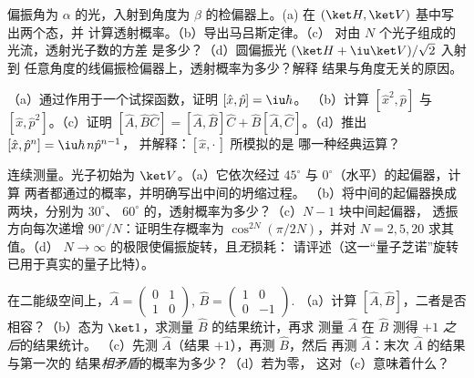 \begin{exercise}[$\star$]\label{exo:b3:quantum-formalism:3}
偏振角为 $\alpha$ 的光，入射到角度为
$\beta$ 的检偏器上。(a) 在 $(\ket H, \ket V)$ 基中写出两个态，并
计算透射概率。（b）导出马吕斯定律。（c）
对由 $N$ 个光子组成的光流，透射光子数的方差
是多少？（d）圆偏振光 $(\ket H + \iu\ket V)/\sqrt2$ 入射到
任意角度的线偏振检偏器上，透射概率为多少？解释
结果与角度无关的原因。
\end{exercise}

\begin{exercise}[$\star$]\label{exo:b3:quantum-formalism:4}
（a）通过作用于一个试探函数，证明 $[\hat x, \hat p] = \iu\hbar$。
（b）计算 $[\hat x^2, \hat p]$ 与 $[\hat x, \hat p^2]$。（c）证明
$[\hat A, \hat B\hat C] = [\hat A, \hat B]\hat C + \hat B[\hat A,
\hat C]$。（d）推出 $[\hat x, \hat p^n] = \iu\hbar\,n\hat p^{n-1}$，
并解释：$[\hat x, \cdot\,]$ 所模拟的是
哪一种经典运算？
\end{exercise}

\begin{exercise}[$\star\star$]\label{exo:b3:quantum-formalism:5}
连续测量。光子初始为 $\ket V$。（a）它依次经过
$45^\circ$ 与 $0^\circ$（水平）的起偏器，计算
两者都通过的概率，并明确写出中间的坍缩过程。
（b）将中间的起偏器换成两块，分别为 $30^\circ$、
$60^\circ$ 的，透射概率为多少？（c）$N - 1$ 块中间起偏器，
透振方向每次递增 $90^\circ/N$：证明生存概率为
$\cos^{2N}(\pi/2N)$，并对 $N = 2, 5, 20$ 求其值。（d）
$N \to \infty$ 的极限使偏振旋转，且\emph{无}损耗：
请评述（这一“量子芝诺”旋转已用于真实的量子比特）。
\end{exercise}

\begin{exercise}[$\star\star$]\label{exo:b3:quantum-formalism:6}
在二能级空间上，$\hat A = \begin{pmatrix}0&1\\1&0
\end{pmatrix}$, $\hat B = \begin{pmatrix}1&0\\0&-1\end{pmatrix}$.
（a）计算 $[\hat A, \hat B]$，二者是否相容？（b）态为
$\ket1$，求测量 $\hat B$ 的结果统计，再求
测量 $\hat A$ 在 $\hat B$ 测得 $+1$ \emph{之后}的结果统计。
（c）先测 $\hat A$（结果 $+1$），再测 $\hat B$，然后
再测 $\hat A$：末次 $\hat A$ 的结果与第一次的
结果\emph{相矛盾}的概率为多少？（d）若为零，
这对（c）意味着什么？
\end{exercise}

